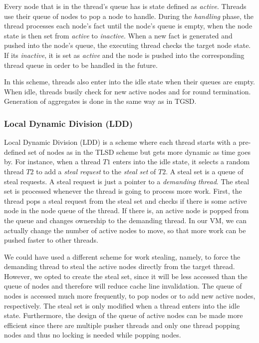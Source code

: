 \documentclass[preprint]{sigplanconf}
\begin{document}
Every node that is in the thread's queue has is state defined as \emph{active}.
Threads use their queue of nodes to pop a node to handle. During the \emph{handling} phase,
the thread processes each node's fact until the node's queue is empty, when the node state is then
set from \emph{active} to \emph{inactive}. When a new fact is generated and pushed into
the node's queue, the executing thread checks the target node state. If its \emph{inactive},
it is set as \emph{active} and the node is pushed into the corresponding thread queue in
order to be handled in the future.

In this scheme, threads also enter into the idle state when their queues are empty. When
idle, threads busily check for new active nodes and for round termination. Generation of
aggregates is done in the same way as in TGSD.

\subsubsection{Local Dynamic Division (LDD)}

Local Dynamic Division (LDD) is a scheme where each thread starts with a pre-defined set
of nodes as in the TLSD scheme but gets more dynamic as time goes by.
For instance, when a thread $T1$ enters into the idle state, it
selects a random thread $T2$ to add a \emph{steal request} to the \emph{steal set} of $T2$.
A steal set is a queue of steal requests. A steal request is just a pointer to a
\emph{demanding thread}.
The steal set is processed whenever the thread is going to process more work. First, the thread
pops a steal request from the steal set and checks if there is some active node in the node queue
of the thread. If there is, an active node is popped from the queue and changes ownership
to the demanding thread. In our VM, we can actually change the number of active nodes
to move, so that more work can be pushed faster to other threads.

We could have used a different scheme for work stealing, namely, to force the demanding thread
to steal the active nodes directly from the target thread. However, we opted to create the
steal set, since it will be less accessed than the queue of nodes and therefore will reduce
cache line invalidation. The queue of nodes
is accessed much more frequently, to pop nodes or to add new active nodes, respectively.
The steal set is only modified when a thread enters into the idle state. Furthermore, the design
of the queue of active nodes can be made more efficient since there are multiple pusher threads
and only one thread popping nodes and thus no locking is needed while popping nodes. 
\end{document}
